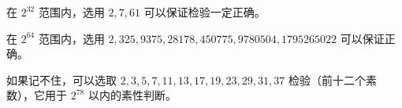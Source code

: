在 $2^{32}$ 范围内，选用 $2,7,61$ 可以保证检验一定正确。

在 $2^{64}$ 范围内，选用 $2,325,9375,28178,450775,9780504,1795265022$ 可以保证正确。

如果记不住，可以选取 $2,3,5,7,11,13,17,19,23,29,31,37$ 检验（前十二个素数），它用于 $2^{78}$ 以内的素性判断。